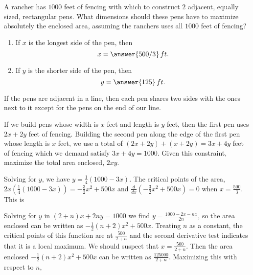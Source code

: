 \documentclass{ximera}
\begin{document}
\begin{exercise}
A rancher has $1000$ feet of fencing with which to construct $2$ adjacent, equally sized, rectangular pens. What dimensions should these pens have to maximize absolutely the enclosed area, assuming the ranchers uses all $1000$ feet of fencing?
\begin{enumerate}
\item		If $x$ is the longest side of the pen, then \[x=\answer{500/3}\,ft.\]
\item		If $y$ is the shorter side of the pen, then \[y=\answer{125}\,ft.\]
\end{enumerate}
  \begin{hint}
If the pens are adjacent in a line, then each pen shares two sides with the ones next to it except for the pens on the end of our line.
\end{hint}
\begin{hint}
If we build pens whose width is $x$ feet and length is $y$ feet, then the first pen uses $2x+2y$ feet of fencing. Building the second pen along the edge of the first pen whose length is $x$ feet, we use a total of $(2x+2y)+(x+2y)=3x+4y$ feet of fencing which we demand satisfy $3x+4y=1000$. Given this constraint, maximize the total area enclosed, $2xy$.
\end{hint}
\begin{hint}
Solving for $y$, we have $y=\frac{1}{4}(1000-3x)$. The critical points of the area, $2x\left(\frac{1}{4}(1000-3x)\right)=-\frac{3}{2}x^2+500x$ and $\frac{d}{dx}(-\frac{3}{2}x^2+500x)=0$ when $x=\frac{500}{3}$. This is 
\end{hint}
\begin{hint}
Solving for $y$ in $(2+n)x+2ny=1000$ we find $y=\frac{1000-2x-nx}{2n}$, so the area enclosed can be written as $-\frac{1}{2}(n+2)x^2+500x$. Treating $n$ as a constant, the critical points of this function are at $\frac{500}{2+n}$ and the second derivative test indicates that it is a local maximum. We should suspect that $x=\frac{500}{2+n}$. Then the area enclosed $-\frac{1}{2}(n+2)x^2+500x$ can be written as $\frac{125000}{2+n}$. Maximizing this with respect to $n$,  
\end{hint}

\end{exercise}
\end{document}
